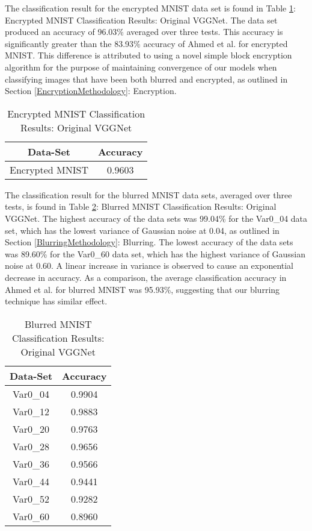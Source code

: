 \documentclass[12pt, titlepage]{article}
\begin{document}
\noindent The classification result for the encrypted MNIST data set is found in Table \ref{table:basicVGG_Encryption}: Encrypted MNIST Classification Results: Original VGGNet. The data set produced an accuracy of 96.03\% averaged over three tests. This accuracy is significantly greater than the 83.93\% accuracy of Ahmed et al. for encrypted MNIST. This difference is attributed to using a novel simple block encryption algorithm for the purpose of maintaining convergence of our models when classifying images that have been both blurred and encrypted, as outlined in Section \ref{EncryptionMethodology}: Encryption.\\

\begin{table}[!h]
	\begin{center}
		\begin{tabular}{| c | c |}
			\hline
			\textbf{Data-Set} & \textbf{Accuracy}\\
			\hline
			Encrypted MNIST & 0.9603\\
			\hline
		\end{tabular}
		\caption{Encrypted MNIST Classification Results: Original VGGNet}
		\label{table:basicVGG_Encryption}
	\end{center}
\end{table}

\noindent The classification result for the blurred MNIST data sets, averaged over three tests, is found in Table \ref{table:basicVGG_Blurred}: Blurred MNIST Classification Results: Original VGGNet. The highest accuracy of the data sets was 99.04\% for the Var0\_04 data set, which has the lowest variance of Gaussian noise at 0.04, as outlined in Section \ref{BlurringMethodology}: Blurring. The lowest accuracy of the data sets was 89.60\% for the Var0\_60 data set, which has the highest variance of Gaussian noise at 0.60. A linear increase in variance is observed to cause an exponential decrease in accuracy. As a comparison, the average classification accuracy in Ahmed et al. for blurred MNIST was 95.93\%, suggesting that our blurring technique has similar effect.

\begin{table}[!h]
	\begin{center}
		\begin{tabular}{| c | c |}
			\hline
			\textbf{Data-Set} & \textbf{Accuracy}\\
			\hline
			Var0\_04 & 0.9904\\
			\hline
			Var0\_12 & 0.9883\\
			\hline
			Var0\_20 & 0.9763\\
			\hline
			Var0\_28 & 0.9656\\
			\hline
			Var0\_36 & 0.9566\\
			\hline
			Var0\_44 & 0.9441\\
			\hline
			Var0\_52 & 0.9282\\
			\hline
			Var0\_60 & 0.8960\\
			\hline
		\end{tabular}
		\caption{Blurred MNIST Classification Results: Original VGGNet}
		\label{table:basicVGG_Blurred}
	\end{center}
\end{table}
\end{document}
